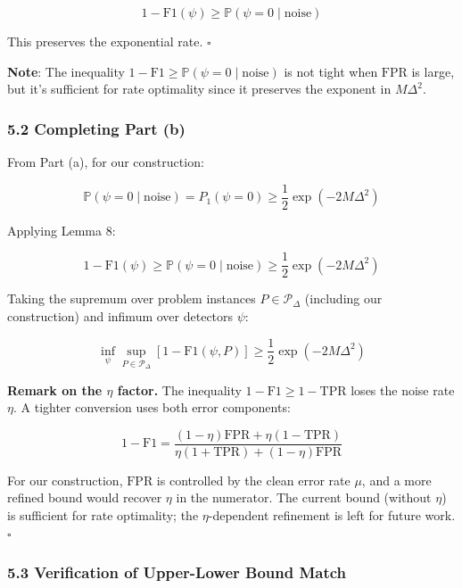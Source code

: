 \documentclass[
  12pt,
]{article}
\begin{document}
\[1 - \text{F1}(\psi) \geq \mathbb{P}(\psi=0 \mid \text{noise})\]

This preserves the exponential rate. \(\square\)

\textbf{Note}: The inequality
\(1 - \text{F1} \geq \mathbb{P}(\psi=0 \mid \text{noise})\) is not tight
when \(\text{FPR}\) is large, but it's sufficient for rate optimality
since it preserves the exponent in \(M\Delta^2\).

\subsubsection{5.2 Completing Part (b)}\label{completing-part-b}

From Part (a), for our construction:

\[\mathbb{P}(\psi=0 \mid \text{noise}) = P_1(\psi=0) \geq \frac{1}{2}\exp(-2M\Delta^2)\]

Applying Lemma 8:

\[1 - \text{F1}(\psi) \geq \mathbb{P}(\psi=0 \mid \text{noise}) \geq \frac{1}{2}\exp(-2M\Delta^2)\]

Taking the supremum over problem instances \(P \in \mathcal{P}_\Delta\)
(including our construction) and infimum over detectors \(\psi\):

\[\inf_{\psi} \sup_{P \in \mathcal{P}_\Delta} [1 - \text{F1}(\psi, P)] \geq \frac{1}{2}\exp(-2M\Delta^2)\]

\textbf{Remark on the \(\eta\) factor.} The inequality
\(1-\text{F1} \geq 1-\text{TPR}\) loses the noise rate \(\eta\). A
tighter conversion uses both error components:

\[1 - \text{F1} = \frac{(1-\eta)\text{FPR} + \eta(1-\text{TPR})}{\eta(1+\text{TPR}) + (1-\eta)\text{FPR}}\]

For our construction, \(\text{FPR}\) is controlled by the clean error
rate \(\mu\), and a more refined bound would recover \(\eta\) in the
numerator. The current bound (without \(\eta\)) is sufficient for rate
optimality; the \(\eta\)-dependent refinement is left for future work.
\(\square\)

\subsubsection{5.3 Verification of Upper-Lower Bound
Match}\label{verification-of-upper-lower-bound-match}
\end{document}
